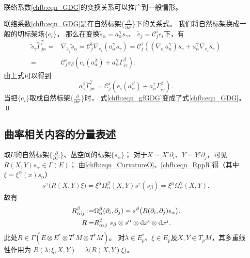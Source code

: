 \begin{example}
	联络系数\eqref{chfb:eqn_GDG}的变换关系可以推广到一般情形。
\end{example}
联络系数\eqref{chfb:eqn_GDG}是在自然标架$\{\frac{\partial }{\partial x^i}\}$下的关系式。
我们将自然标架换成一般的切标架场$\{e_i\}$，
那么在变换$\tilde{s}_\alpha=a_{\alpha}^\gamma s_\gamma$、
$\tilde{e}_j=\mathcal{C}_{j}^i e_i$下，有
\begin{align*}
	\tilde{s}_\gamma \tilde{\Gamma}^\gamma_{j \alpha}
	=&  \nabla_{\tilde{e}_j} \tilde{s}_\alpha
	= \mathcal{C}_{j}^i \nabla_{e_i} \left(a_{\alpha}^\gamma s_\gamma\right)
	= \mathcal{C}_{j}^i \left( \left(\nabla_{e_i} a_{\alpha}^\gamma\right) s_\gamma
	+ a_{\alpha}^\gamma  \nabla_{e_i} s_\gamma\right) \\
	=& \mathcal{C}_{j}^i s_\beta \left({e_i}\left( a_{\alpha}^\beta\right)
	+ a_{\alpha}^\gamma \Gamma^\beta_{i \gamma} \right) .
\end{align*}
由上式可以得到
\begin{equation}\label{chfb:eqn_gfGDG}
	a_{\gamma}^\beta \tilde{\Gamma}^\gamma_{j \alpha} = \mathcal{C}_{j}^i
	\left({e_i}\left( a_{\alpha}^\beta\right)
	+ a_{\alpha}^\gamma \Gamma^\beta_{i \gamma} \right) .
\end{equation}
当把$\{e_i\}$取成自然标架$\{\frac{\partial }{\partial x^i}\}$时，
式\eqref{chfb:eqn_gfGDG}变成了式\eqref{chfb:eqn_GDG}。
\qed

\subsection{曲率相关内容的分量表述}

取$U$的自然标架$\{\frac{\partial }{\partial x^i}\}$、丛空间的标架$\{s_\alpha\}$；
对于$X=X^i \partial_i$、$Y=Y^j \partial_j$，可见$R(X, Y) s_\alpha \in \Gamma(E)$；
由\eqref{chfb:eqn_CurvatureO}、\eqref{chfb:eqn_RppR}得（其中$\xi = \xi^\alpha(x) s_{\alpha}$）
\begin{align*}
	s^{\gamma}\bigl(R(X,Y)\xi\bigr)
	=\xi^\alpha \Omega_{\alpha}^\beta(X, Y) s^{\gamma}(s_\beta)
	=\xi^\alpha \Omega_{\alpha}^\gamma (X, Y) .
\end{align*}
故有
\begin{subequations}
	\begin{align}
	R_{\alpha i j}^\beta := &
	\Omega_{\alpha}^\beta (\partial_i, \partial_j) =	s^{\beta}\bigl(R(\partial_i,\partial_j)s_\alpha\bigr) .   \\
	R =& R_{\alpha i j}^\beta \ s_\beta \otimes
	s^{\alpha}\otimes \dd x^i \otimes \dd x^j . 
	\end{align}
\end{subequations}
此处$R\in\Gamma(E\otimes E^*\otimes T^*M\otimes T^*M)$。
对$\lambda\in E_p^*$、$\xi\in E_p$及$X,Y\in T_pM$，其多重线性作用为
$R(\lambda;\xi,X,Y)=\lambda\bigl(R(X,Y)\xi\bigr)$。

